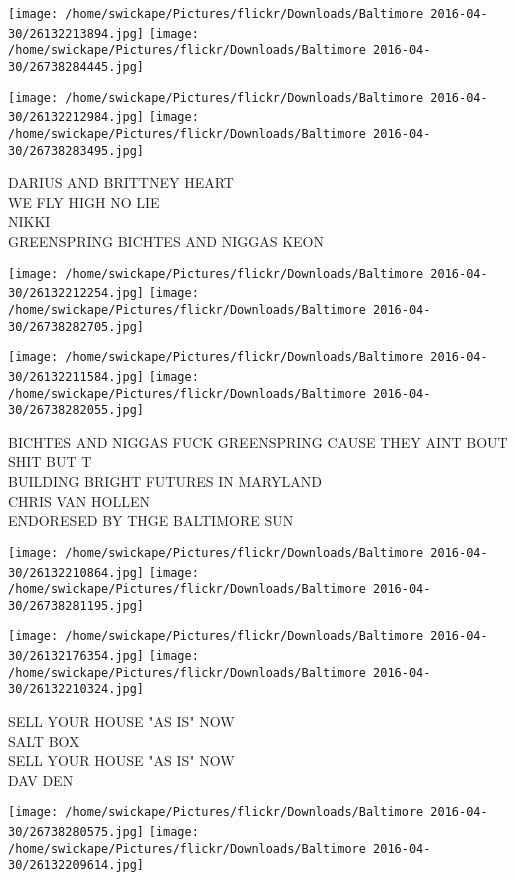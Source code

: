 \documentclass[10pt,letterpaper]{article}
\begin{document}
\texttt{[image: /home/swickape/Pictures/flickr/Downloads/Baltimore 2016-04-30/26132213894.jpg]}
\texttt{[image: /home/swickape/Pictures/flickr/Downloads/Baltimore 2016-04-30/26738284445.jpg]}

\texttt{[image: /home/swickape/Pictures/flickr/Downloads/Baltimore 2016-04-30/26132212984.jpg]}
\texttt{[image: /home/swickape/Pictures/flickr/Downloads/Baltimore 2016-04-30/26738283495.jpg]}

DARIUS AND BRITTNEY HEART\\
WE FLY HIGH NO LIE\\
NIKKI\\
GREENSPRING BICHTES AND NIGGAS KEON\\
\pagebreak

\texttt{[image: /home/swickape/Pictures/flickr/Downloads/Baltimore 2016-04-30/26132212254.jpg]}
\texttt{[image: /home/swickape/Pictures/flickr/Downloads/Baltimore 2016-04-30/26738282705.jpg]}

\texttt{[image: /home/swickape/Pictures/flickr/Downloads/Baltimore 2016-04-30/26132211584.jpg]}
\texttt{[image: /home/swickape/Pictures/flickr/Downloads/Baltimore 2016-04-30/26738282055.jpg]}

BICHTES AND NIGGAS FUCK GREENSPRING CAUSE THEY AINT BOUT SHIT BUT T\\
BUILDING BRIGHT FUTURES IN MARYLAND\\
CHRIS VAN HOLLEN\\
ENDORESED BY THGE BALTIMORE SUN\\
\pagebreak

\texttt{[image: /home/swickape/Pictures/flickr/Downloads/Baltimore 2016-04-30/26132210864.jpg]}
\texttt{[image: /home/swickape/Pictures/flickr/Downloads/Baltimore 2016-04-30/26738281195.jpg]}

\texttt{[image: /home/swickape/Pictures/flickr/Downloads/Baltimore 2016-04-30/26132176354.jpg]}
\texttt{[image: /home/swickape/Pictures/flickr/Downloads/Baltimore 2016-04-30/26132210324.jpg]}

SELL YOUR HOUSE "AS IS" NOW\\
SALT BOX\\
SELL YOUR HOUSE "AS IS" NOW\\
DAV DEN\\
\pagebreak

\texttt{[image: /home/swickape/Pictures/flickr/Downloads/Baltimore 2016-04-30/26738280575.jpg]}
\texttt{[image: /home/swickape/Pictures/flickr/Downloads/Baltimore 2016-04-30/26132209614.jpg]}
\end{document}

